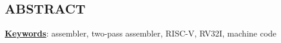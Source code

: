 \begin{otherlanguage}{english}
\chapter*{ABSTRACT}
\thispagestyle{empty}


\bigskip
\noindent\underline{\textbf{Keywords}}: assembler, two-pass assembler, RISC-V, RV32I, machine code
\end{otherlanguage}
